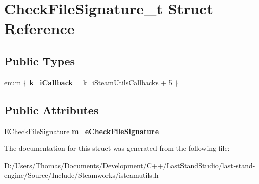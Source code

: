 \hypertarget{structCheckFileSignature__t}{}\section{Check\+File\+Signature\+\_\+t Struct Reference}
\label{structCheckFileSignature__t}
\subsection*{Public Types}
\begin{DoxyCompactItemize}
\item 
\hypertarget{structCheckFileSignature__t_a4c234d76396a8280942555321cdce542}{}enum \{ {\bfseries k\+\_\+i\+Callback} = k\+\_\+i\+Steam\+Utils\+Callbacks + 5
 \}\label{structCheckFileSignature__t_a4c234d76396a8280942555321cdce542}

\end{DoxyCompactItemize}
\subsection*{Public Attributes}
\begin{DoxyCompactItemize}
\item 
\hypertarget{structCheckFileSignature__t_a9b8fba3c51d8f787c56d47c6942155d1}{}E\+Check\+File\+Signature {\bfseries m\+\_\+e\+Check\+File\+Signature}\label{structCheckFileSignature__t_a9b8fba3c51d8f787c56d47c6942155d1}

\end{DoxyCompactItemize}


The documentation for this struct was generated from the following file\+:\begin{DoxyCompactItemize}
\item 
D\+:/\+Users/\+Thomas/\+Documents/\+Development/\+C++/\+Last\+Stand\+Studio/last-\/stand-\/engine/\+Source/\+Include/\+Steamworks/isteamutils.\+h\end{DoxyCompactItemize}
